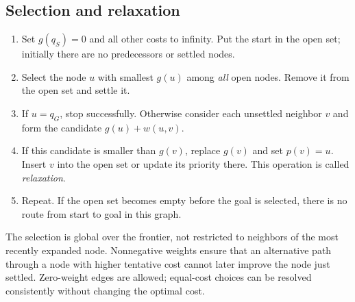 \subsection{Selection and relaxation}
\begin{enumerate}
\item Set $g(q_S)=0$ and all other costs to infinity. Put the start in
the open set; initially there are no predecessors or settled nodes.
\item Select the node $u$ with smallest $g(u)$ among \emph{all} open
nodes. Remove it from the open set and settle it.
\item If $u=q_G$, stop successfully. Otherwise consider each unsettled
neighbor $v$ and form the candidate $g(u)+w(u,v)$.
\item If this candidate is smaller than $g(v)$, replace $g(v)$ and set
$p(v)=u$. Insert $v$ into the open set or update its priority there.
This operation is called \emph{relaxation}.
\item Repeat. If the open set becomes empty before the goal is selected,
there is no route from start to goal in this graph.
\end{enumerate}
The selection is global over the frontier, not restricted to neighbors
of the most recently expanded node. Nonnegative weights ensure that an
alternative path through a node with higher tentative cost cannot later
improve the node just settled. Zero-weight edges are allowed; equal-cost
choices can be resolved consistently without changing the optimal cost.

